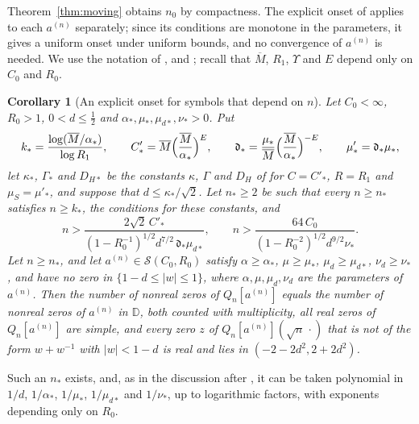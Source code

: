 \documentclass[11pt]{amsart}
\newtheorem{corollary}[theorem]{Corollary}
\theoremstyle{definition}
\theoremstyle{remark}
\numberwithin{equation}{section}
\newcommand{\D}{\mathbb{D}}
\begin{document}
Theorem~\ref{thm:moving} obtains $n_0$ by compactness. The explicit onset of \cite[Theorem~\ref{A-thm:quant}]{CompA} applies to each $a^{(n)}$ separately; since its conditions are monotone in the parameters, it gives a uniform onset under uniform bounds, and no convergence of $a^{(n)}$ is needed. We use the notation of \cite[Definition~\ref{A-def:condition}]{CompA}, \cite[Lemma~\ref{A-lem:outer}]{CompA} and \cite[Theorem~\ref{A-thm:quant}]{CompA}; recall that $\overline M$, $R_1$, $\Upsilon$ and $E$ depend only on $C_0$ and $R_0$.

\begin{corollary}[An explicit onset for symbols that depend on $n$]\label{cor:moving-onset}
Let $C_0<\infty$, $R_0>1$, $0<d\le\frac12$ and $\alpha_*,\mu_*,\mu_{d*},\nu_*>0$. Put
\[
k_*=\frac{\log(\overline M/\alpha_*)}{\log R_1},\qquad C'_*=\overline M\Bigl(\frac{\overline M}{\alpha_*}\Bigr)^{E},\qquad\mathfrak d_*=\frac{\mu_*}{\overline M}\Bigl(\frac{\overline M}{\alpha_*}\Bigr)^{-E},\qquad\mu'_*=\mathfrak d_*\mu_*,
\]
let $\kappa_*$, $\Gamma_*$ and $D_{H*}$ be the constants $\kappa$, $\Gamma$ and $D_H$ of \cite[Lemma~\ref{A-lem:bulk-explicit}]{CompA} for $C=C'_*$, $R=R_1$ and $\mu_S=\mu'_*$, and suppose that $d\le\kappa_*/\sqrt2$. Let $n_*\ge2$ be such that every $n\ge n_*$ satisfies $n\ge k_*$, the conditions \cite[\eqref{A-eq:bulk-explicit}]{CompA} for these constants, and
\[
n>\frac{2\sqrt2\,C'_*}{(1-R_0^{-1})^{1/2}d^{7/2}\,\mathfrak d_*\mu_{d*}},\qquad n>\frac{64\,C_0}{(1-R_0^{-2})^{1/2}d^{9/2}\nu_*}.
\]
Let $n\ge n_*$, and let $a^{(n)}\in\mathcal S(C_0,R_0)$ satisfy $\alpha\ge\alpha_*$, $\mu\ge\mu_*$, $\mu_d\ge\mu_{d*}$, $\nu_d\ge\nu_*$, and have no zero in $\{1-d\le|w|\le1\}$, where $\alpha,\mu,\mu_d,\nu_d$ are the parameters of $a^{(n)}$. Then the number of nonreal zeros of $Q_n[a^{(n)}]$ equals the number of nonreal zeros of $a^{(n)}$ in $\D$, both counted with multiplicity, all real zeros of $Q_n[a^{(n)}]$ are simple, and every zero $z$ of $Q_n[a^{(n)}](\sqrt n\,\cdot)$ that is not of the form $w+w^{-1}$ with $|w|<1-d$ is real and lies in $(-2-2d^2,2+2d^2)$.
\end{corollary}

Such an $n_*$ exists, and, as in the discussion after \cite[Theorem~\ref{A-thm:quant}]{CompA}, it can be taken polynomial in $1/d$, $1/\alpha_*$, $1/\mu_*$, $1/\mu_{d*}$ and $1/\nu_*$, up to logarithmic factors, with exponents depending only on $R_0$.
\end{document}
